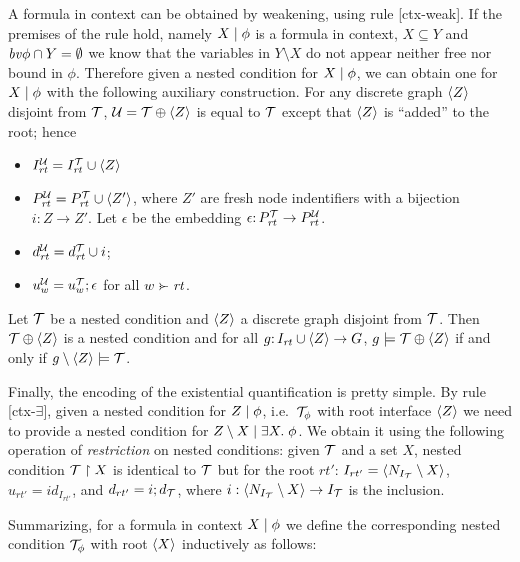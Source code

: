 A formula in context can be obtained by weakening, using rule [ctx-weak]. If the premises of the rule hold, namely ${X} \mid {\phi}$ is a formula in context, $X\subseteq Y$ and $\mathit{bv}{\phi} \cap Y = \emptyset$ we know that the variables in $Y \setminus X$ do not appear neither free nor bound in $\phi$. Therefore given a {\proper} nested condition for ${X} \mid {\phi}$, we can obtain one for ${X} \mid {\phi}$ with the following auxiliary construction. For any discrete graph $\langle Z\rangle$ disjoint from ${\mathcal{T}}$, ${\mathcal{U}}={\mathcal{T}}\oplus \langle Z\rangle$ is equal to ${\mathcal{T}}$ except that $\langle Z\rangle$ is ``added'' to the root; hence
\begin{itemize}
\item $I^{\mathcal{U}}_{\mathit{rt}}=I^{\mathcal{T}}_{\mathit{rt}}\cup \langle Z\rangle$ 
\item $P^{\mathcal{U}}_{\mathit{rt}}=P^{\mathcal{T}}_{\mathit{rt}}\cup \langle Z'\rangle$, where $Z'$ are fresh node indentifiers with a bijection $i : Z \to Z'$. Let  $\epsilon$ be the embedding $ \epsilon {:}\, P^{\mathcal{T}}_{\mathit{rt}}\rightarrow P^{\mathcal{U}}_{\mathit{rt}}$. 
\item $d^{\mathcal{U}}_{\mathit{rt}}=d^{\mathcal{T}}_{\mathit{rt}}\cup i$;
\item $u^{\mathcal{U}}_w=u^{\mathcal{T}}_w;\epsilon$ for all $w\childof \rt$. 
\end{itemize}

\begin{proposition}
\label{pr:weakening satisfaction}
Let ${\mathcal{T}}$ be a {\proper} nested condition and $\langle Z\rangle$ a discrete graph disjoint from ${\mathcal{T}}$. Then ${\mathcal{T}} \oplus \langle Z\rangle$ is a {\proper} nested condition and for all $g{:}\, I_{\mathit{rt}}\cup \langle Z\rangle\rightarrow G$, $g\models {\mathcal{T}}\oplus \langle Z\rangle$ if and only if $g\setminus \langle Z\rangle \models{\mathcal{T}}$.
\end{proposition}

Finally, the encoding of the existential quantification is pretty simple. By rule [ctx-$\exists$], given a nested condition for ${Z} \mid {\phi}$, i.e.\ ${\mathcal{T}}_\phi$ with root interface $\langle Z\rangle$ we need to provide a nested condition for  ${Z\setminus X} \mid {\exists X .\;\phi}$. We obtain it using the following operation of \emph{restriction} on nested conditions: given ${\mathcal{T}}$ and a set $X$, nested condition ${\mathcal{T}}\restriction X$ is identical to ${\mathcal{T}}$ but for the root $rt'$: $I_{rt'} = \langle N_{I_{\mathcal{T}}}\setminus X\rangle$, $u_{rt'} = id_{I_{rt'}}$, and $d_{rt'} = i ; d_{\mathcal{T}}$, where $i: \langle N_{I_{\mathcal{T}}}\setminus X\rangle \rightarrow I_{\mathcal{T}}$ is the inclusion. 

Summarizing, for a formula in context ${X} \mid {\phi}$ we define the corresponding nested condition ${\mathcal{T}}_\phi$ with root $\langle X\rangle$  inductively as follows:

